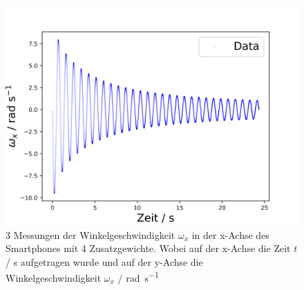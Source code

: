\documentclass[11pt,ngerman]{scrartcl}
\begin{document}
\begin{figure}[H]
\begin{minipage}[htbp]{\linewidth}
\begin{minipage}[htbp]{.32\linewidth}
            \includegraphics[width=\linewidth]{pics/omega/fit_of_t_wx_mess_nr_6.png}
        \end{minipage}
        \caption[Schwingungsmessungen mit 4 Zusatzgewichte]{3 Messungen der Winkelgeschwindigkeit $\omega_{x}$ in der x-Achse des Smartphones mit 4 Zusatzgewichte.
        Wobei auf der x-Achse die Zeit $t$ / \si{\second} aufgetragen wurde und auf der y-Achse die Winkelgeschwindigkeit $\omega_x$ / \si{\radian\per\second} }

        \label{fig:mit4}
    \end{minipage}
 \end{figure}
\end{document}
